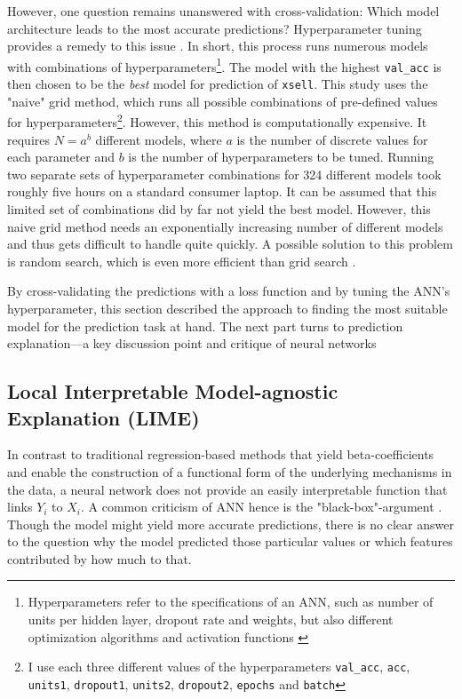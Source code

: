 \documentclass[12pt,a4paper]{article}
\let\code=\texttt
\begin{document}
However, one question remains unanswered with cross-validation: Which model architecture leads to the most accurate predictions?
Hyperparameter tuning provides a remedy to this issue \citep{bergstraRandomSearchHyperparameter2012}.
In short, this process runs numerous models with combinations of hyperparameters\footnote{Hyperparameters refer to the specifications of an ANN,
such as number of units per hidden layer, dropout rate and weights, but also different optimization algorithms and activation functions \citep{bengioGradientbasedOptimizationHyperparameters2000}}. 
The model with the highest \code{val\_acc} is then chosen to be the \textit{best} model for prediction of \code{xsell}.
This study uses the "naive" grid method, which runs all possible combinations of pre-defined values for hyperparameters\footnote{I use each three different values of the hyperparameters \code{val\_acc}, \code{acc}, \code{units1}, \code{dropout1}, \code{units2}, \code{dropout2}, \code{epochs} and \code{batch}}.
However, this method is computationally expensive.
It requires $N=a^b$ different models, where $a$ is the number of discrete values for each parameter and $b$ is the 
number of hyperparameters to be tuned.
Running two separate sets of hyperparameter combinations for 324 different models took roughly five hours on a standard consumer laptop.
It can be assumed that this limited set of combinations did by far not yield the best model.
However, this naive grid method needs an exponentially increasing number of different models and thus gets difficult to handle quite quickly.
A possible solution to this problem is random search, which is even more efficient than grid search \citep{bergstraRandomSearchHyperparameter2012}.

By cross-validating the predictions with a loss function and by tuning the ANN's hyperparameter, 
this section described the approach to finding the most suitable model for the prediction task at hand.
The next part turns to prediction explanation---a key discussion point and critique of neural networks

\subsection{Local Interpretable Model-agnostic Explanation (LIME)} \label{sec_lime_theory}
In contrast to traditional regression-based methods that yield beta-coefficients and enable the construction of a functional form of 
the underlying mechanisms in the data, a neural network does not provide an easily interpretable function that links $Y_i$ to $X_i$.
A common criticism of ANN hence is the "black-box"-argument \citep{benitezAreArtificialNeural1997, dayhoffArtificialNeuralNetworks2001}.
Though the model might yield more accurate predictions, there is no clear answer to the question why the model predicted those particular values
or which features contributed by how much to that.
\end{document}
